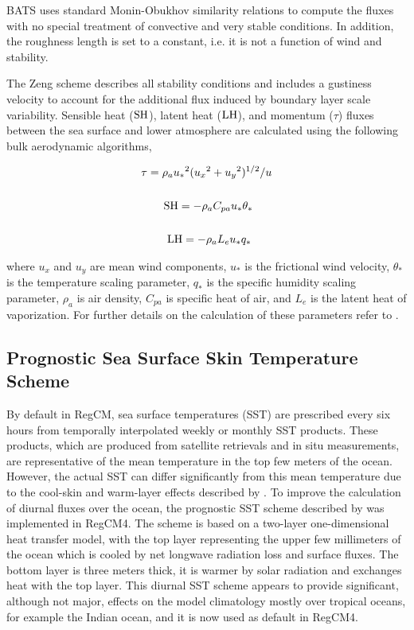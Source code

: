 {\ac{BATS} uses standard Monin-Obukhov similarity relations to compute the
fluxes with no
special treatment of convective and very stable conditions.  In addition, the
roughness length is set to a constant, i.e. it is not a function of wind and
stability.  

The Zeng scheme describes all stability conditions and
includes a gustiness velocity to account for the additional flux induced by
boundary layer scale variability. Sensible heat (${\rm SH}$), latent heat (${\rm
LH}$), and momentum ($\tau$) fluxes between the sea surface and lower atmosphere
are calculated using the following bulk aerodynamic algorithms,
    
\begin{eqnarray}
\tau = \rho_a {u_{\ast}}^2 ({u_{x}}^2 + {u_{y}}^2)^{1/2} / u \\ \nonumber \\
{\rm SH} = -\rho_a C_{pa} u_{\ast} \theta_{\ast} \hspace{.6cm} \\ \nonumber \\
{\rm LH} =  -\rho_a L_{e} u_{\ast} q_{\ast}  \hspace{.65cm}
\end{eqnarray}

where $u_x$ and $u_y$ are mean wind components, $u_{\ast}$ is the
frictional wind velocity, $\theta_{\ast}$ is the temperature scaling parameter,
$q_{\ast}$ is the specific humidity scaling parameter,  $\rho_a$ is air density,
$C_{pa}$ is specific heat of air, and $L_{e}$ is the latent heat of
vaporization.  For further details on the calculation of these parameters refer
to \cite{Zeng_98}.
 
\subsection{Prognostic Sea Surface Skin Temperature Scheme}

By default in \ac{RegCM}, sea surface temperatures (SST) are prescribed every
six hours from temporally interpolated weekly or monthly SST products.
These products, which are produced from satellite retrievals and in situ
measurements, are representative of the mean temperature in the top
few meters of the ocean. However, the actual SST can differ significantly
from this mean temperature due to the cool-skin and warm-layer effects
described by \cite{Fairall_96}. To improve the calculation of diurnal fluxes
over the ocean, the prognostic SST scheme described by \cite{Zeng_05} was
implemented in \ac{RegCM4}. The scheme is based on a two-layer
one-dimensional heat transfer model, with the top layer representing the
upper few millimeters of the ocean which is cooled by net longwave radiation
loss and surface fluxes. The bottom layer is three meters thick, it is warmer by
solar radiation and exchanges heat with the top layer. This diurnal SST
scheme appears to provide significant, although not major, effects on the
model climatology mostly over tropical oceans, for example the Indian ocean,
and it is now used as default in \ac{RegCM4}.

}
